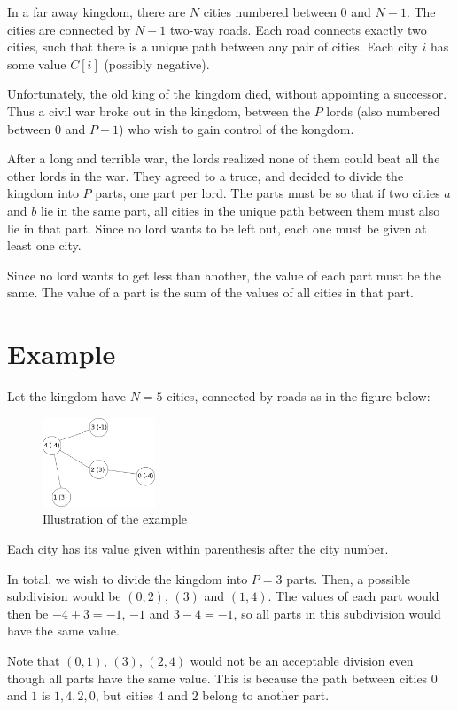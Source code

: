 \newcommand\version{v2}
In a far away kingdom, there are $N$ cities numbered between $0$ and $N - 1$.
The cities are connected by $N - 1$ two-way roads.
Each road connects exactly two cities, such that there is a unique path between any pair of cities. Each city $i$ has some value $C[i]$ (possibly negative).

Unfortunately, the old king of the kingdom died, without appointing a successor. Thus a civil war broke out in the kingdom, between the $P$ lords (also numbered between $0$ and $P - 1$) who wish to gain control of the kongdom.

After a long and terrible war, the lords realized none of them could beat all the other lords in the war. They agreed to a truce, and decided to divide the kingdom into $P$ parts, one part per lord. The parts must be so that if two cities $a$ and $b$ lie in the same part, all cities in the unique path between them must also lie in that part. Since no lord wants to be left out, each one must be given at least one city.

Since no lord wants to get less than another, the value of each part must be the same. The value of a part is the sum of the values of all cities in that part.

\section*{Example}
Let the kingdom have $N = 5$ cities, connected by roads as in the figure below:
\begin{figure}[h!]
  \centering
  \includegraphics[width=0.3\textwidth]{sample.png}
  \caption{Illustration of the example}
\end{figure}
Each city has its value given within parenthesis after the city number.

In total, we wish to divide the kingdom into $P = 3$ parts.
Then, a possible subdivision would be $(0, 2)$, $(3)$ and $(1, 4)$.
The values of each part would then be $-4 + 3 = -1$, $-1$ and $3 - 4 = -1$,
so all parts in this subdivision would have the same value.

Note that $(0, 1)$, $(3)$, $(2, 4)$ would not be an acceptable division even
though all parts have the same value. This is because the path between cities
$0$ and $1$ is $1, 4, 2, 0$, but cities $4$ and $2$ belong to another part.

